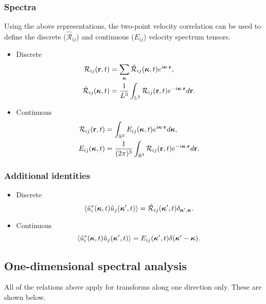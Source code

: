 \documentclass[oneside,a4paper,11pt]{report}
\newcommand{\tpvc}{\mathcal{R}} %
\newcommand{\est}{E}            %
\begin{document}
\subsubsection{Spectra}
Using the above representations, the two-point velocity correlation can be used to define the discrete ($\hat{\tpvc}_{ij}$) and continuous ($\est_{ij}$) velocity spectrum tensors.
\begin{itemize}
\item Discrete
\begin{align}
\label{eq:tpvc_discrete}
\tpvc_{ij}(\rvec,t) & = \sum_{\kvec} \hat{\tpvc}_{ij}(\kvec,t) e^{i \kvec \cdot \rvec}, \\
\label{espec_discrete}
\hat{\tpvc}_{ij}(\kvec,t) & = \frac{1}{L^3} \int_{\mathbb{L}^3} \tpvc_{ij}(\rvec,t) e^{-i \kvec \cdot \rvec} d\rvec.
\end{align}
\item Continuous
\begin{align}
\label{eq:tpvc_continuous}
\tpvc_{ij}(\rvec,t) &= \int_\Rthree E_{ij}(\kvec,t) e^{i \kvec \cdot \rvec} d\kvec, \\
\label{espec_continuous}
E_{ij}(\kvec,t) & = \frac{1}{(2\pi)^3} \int_\Rthree \tpvc_{ij}(\rvec,t) e^{-i\kvec \cdot \rvec} d\rvec.
\end{align}
\end{itemize}

\subsubsection{Additional identities}
\begin{itemize}
\item Discrete
\begin{equation} 
\label{fromu_toE_disc}
\langle \hat{u}_i^*(\kvec,t) \hat{u}_j(\kvec',t) \rangle = \hat{\tpvc}_{ij}(\kvec',t) \delta_{\kvec',\kvec}.
\end{equation}
\item Continuous
\begin{equation} 
\label{fromu_toE_cont}
\langle \hat{u}_i^*(\boldsymbol\kappa,t) \hat{u}_j(\boldsymbol\kappa',t) \rangle = E_{ij}(\boldsymbol\kappa',t)\delta(\boldsymbol\kappa' - \boldsymbol\kappa).
\end{equation}
\end{itemize}

\subsection{One-dimensional spectral analysis}
All of the relations above apply for transforms along one direction only. These are shown below.
\end{document}
